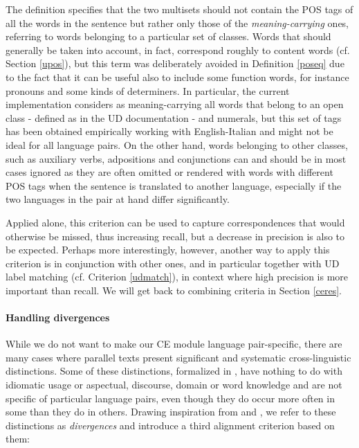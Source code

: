 The definition specifies that the two multisets should not contain the POS tags of all the words in the sentence but rather only those of the \textit{meaning-carrying} ones, referring to words belonging to a particular set of classes. 
Words that should generally be taken into account, in fact, correspond roughly to content words (cf. Section \ref{upos}), but this term was deliberately avoided in Definition \ref{poseq} due to the fact that it can be useful also to include some function words, for instance pronouns and some kinds of determiners.
In particular, the current implementation considers as meaning-carrying all words that belong to an open class - defined as in the UD documentation \cite{uddocs} - and numerals, but this set of tags has been obtained empirically working with English-Italian and might not be ideal for all language pairs.
On the other hand, words belonging to other classes, such as auxiliary verbs, adpositions and conjunctions can and should be in most cases ignored as they are often omitted or rendered with words with different POS tags when the sentence is translated to another language, especially if the two languages in the pair at hand differ significantly. \smallskip

Applied alone, this criterion can be used to capture correspondences that would otherwise be missed, thus increasing recall, but a decrease in precision is also to be expected. Perhaps more interestingly, however, another way to apply this criterion is in conjunction with other ones, and in particular together with UD label matching (cf. Criterion \ref{udmatch}), in context where high precision is more important than recall. We will get back to combining criteria in Section \ref{ceres}.

\paragraph{Handling divergences} \label{divs}
While we do not want to make our CE module language pair-specific, there are many cases where parallel texts present significant and systematic cross-linguistic distinctions. Some of these distinctions, formalized in \cite{divs}, have nothing to do with idiomatic usage or aspectual, discourse, domain or word knowledge and are not specific of particular language pairs, even though they do occur more often in some than they do in others. 
Drawing inspiration from \cite{divs} and \cite{divs2}, we refer to these distinctions as \textit{divergences} and introduce a third alignment criterion based on them: \smallskip

